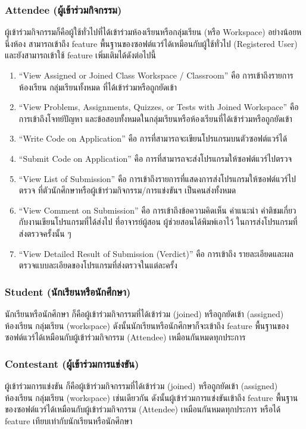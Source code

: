 \documentclass[12pt,one side,openright,a4paper]{cpe-thesis-th}
\newcommand{\thaijustify}[1]{%
  \par\hspace{30pt}\justifying
  #1
}
\begin{document}
        \subsubsection{Attendee (ผู้เข้าร่วมกิจกรรม)}
            \thaijustify{
                ผู้เข้าร่วมกิจกรรมก็คือผู้ใช้ทั่วไปที่ได้เข้าร่วมห้องเรียนหรือกลุ่มเรียน (หรือ Workspace) อย่างน้อยหนึ่งห้อง สามารถเข้าถึง feature พื้นฐานของซอฟต์แวร์ได้เหมือนกับผู้ใช้ทั่วไป (Registered User) และยังสามารถเข้าใช้ feature เพิ่มเติมได้ดังต่อไปนี้
            }
            \begin{enumerate}
                \item “View Assigned or Joined Class Workspace / Classroom” คือ การเข้าถึงรายการห้องเรียน กลุ่มเรียนทั้งหมด ที่ได้เข้าร่วมหรือถูกยัดเข้า
                \item “View Problems, Assignments, Quizzes, or Tests with Joined Workspace” คือการเข้าถึงโจทย์ปัญหา และข้อสอบทั้งหมดในกลุ่มเรียนหรือห้องเรียนที่ได้เข้าร่วมหรือถูกยัดเข้า
                \item “Write Code on Application” คือ การที่สามารถจะเขียนโปรแกรมบนตัวซอฟต์แวร์ได้
                \item “Submit Code on Application” คือ การที่สามารถจะส่งโปรแกรมให้ซอฟต์แวร์ไปตรวจ
                \item “View List of Submission” คือ การเข้าถึงรายการที่แสดงการส่งโปรแกรมให้ซอฟต์แวร์ไปตรวจ ที่ตัวนักศึกษาหรือผู้เข้าร่วมกิจกรรม/การแข่งขันฯ เป็นคนส่งทั้งหมด
                \item “View Comment on Submission” คือ การเข้าถึงข้อความคิดเห็น คำแนะนำ คำติชมเกี่ยวกับงานเขียนโปรแกรมที่ได้ส่งไป ที่อาจารย์ผู้สอน ผู้ช่วยสอนได้พิมพ์เอาไว้ ในการส่งโปรแกรมที่ส่งตรวจครั้งนั้น ๆ
                \item “View Detailed Result of Submission (Verdict)” คือ การเข้าถึง รายละเอียดและผลตรวจแบบละเอียดของโปรแกรมที่ส่งตรวจในแต่ละครั้ง
            \end{enumerate}
        \subsubsection{Student (นักเรียนหรือนักศึกษา)}
            \thaijustify{
                นักเรียนหรือนักศึกษา ก็คือผู้เข้าร่วมกิจกรรมที่ได้เข้าร่วม (joined) หรือถูกยัดเข้า (assigned) ห้องเรียน กลุ่มเรียน (workspace) ดังนั้นนักเรียนหรือนักศึกษาก็จะเข้าถึง feature พื้นฐานของซอฟต์แวร์ได้เหมือนกับผู้เข้าร่วมกิจกรรม (Attendee) เหมือนกันหมดทุกประการ
            }
        \subsubsection{Contestant (ผู้เข้าร่วมการแข่งขัน)}
            \thaijustify{
                ผู้เข้าร่วมการแข่งขัน ก็คือผู้เข้าร่วมกิจกรรมที่ได้เข้าร่วม (joined) หรือถูกยัดเข้า (assigned) ห้องเรียน กลุ่มเรียน (workspace) เช่นเดียวกัน ดังนั้นผู้เข้าร่วมการแข่งขันเข้าถึง feature พื้นฐานของซอฟต์แวร์ได้เหมือนกับผู้เข้าร่วมกิจกรรม (Attendee) เหมือนกันหมดทุกประการ หรือได้ feature เทียบเท่ากับนักเรียนหรือนักศึกษา  
            }
\end{document}
